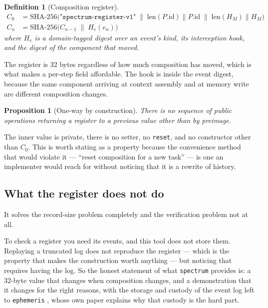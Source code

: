 \documentclass[11pt]{article}
\newtheorem{definition}{Definition}
\newtheorem{proposition}{Proposition}
\newcommand{\spectrum}{\texttt{spectrum}}
\newcommand{\ephemeris}{\texttt{ephemeris}}
\begin{document}
\begin{definition}[Composition register]
\begin{align*}
  C_0 &= \mathrm{SHA\text{-}256}\big(\texttt{"spectrum-register-v1"} \;\|\;
        \mathrm{len}(P.\mathrm{id}) \| P.\mathrm{id} \;\|\;
        \mathrm{len}(H_M) \| H_M \big) \\
  C_n &= \mathrm{SHA\text{-}256}\big(C_{n-1} \;\|\; H_e(e_n)\big)
\end{align*}
where $H_e$ is a domain-tagged digest over an event's kind, its interception
hook, and the digest of the component that moved.
\end{definition}

The register is 32 bytes regardless of how much composition has moved, which
is what makes a per-step field affordable. The hook is inside the event
digest, because the same component arriving at context assembly and at memory
write are different composition changes.

\begin{proposition}[One-way by construction]
There is no sequence of public operations returning a register to a previous
value other than by preimage.
\end{proposition}

\noindent
The inner value is private, there is no setter, no \texttt{reset}, and no
constructor other than $C_0$. This is worth stating as a property because the
convenience method that would violate it --- ``reset composition for a new
task'' --- is one an implementer would reach for without noticing that it is a
rewrite of history.

\subsection{What the register does not do}
\label{sec:register-honest}

It solves the record-size problem completely and the verification problem not
at all.

To check a register you need its events, and this tool does not store them.
Replaying a truncated log does not reproduce the register --- which is the
property that makes the construction worth anything --- but noticing that
requires having the log. So the honest statement of what \spectrum{} provides
is: a 32-byte value that changes when composition changes, and a
demonstration that it changes for the right reasons, with the storage and
custody of the event log left to \ephemeris{} \cite{ephemeristool}, whose own
paper explains why that custody is the hard part.
\end{document}
